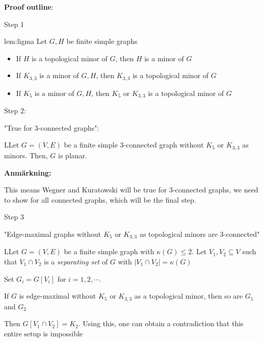 \par\bigskip
\noindent\textbf{Proof outline}:\par
Step 1
\par\bigskip
\begin{lem}{lem:ligma}
  Let $G,H$ be finite simple graphs\par
  \begin{itemize}
    \item If $H$ is a topological minor of $G$, then $H$ is a minor of $G$\par
    \item If $K_{3,3}$ is a minor of $G,H$, then $K_{3,3}$ is a topological minor of $G$\par
    \item If $K_5$ is a minor of $G,H$, then $K_5$ or $K_{3,3}$  is a topological minor of $G$
  \end{itemize}
\end{lem}
\par\bigskip
Step 2:\par
\noindent "True for 3-connected graphs":
\par\bigskip
\begin{lem}
  LLet $G = (V,E)$ be a finite simple 3-connected graph without $K_5$ or $K_{3,3}$ as minors. Then, $G$ is planar.
\end{lem}
\par\bigskip
\noindent\textbf{Anmärkning:}\par
\noindent This means Wegner and Kuratowski will be true for 3-connected graphs, we need to show for all connected graphs, which will be the final step.
\par\bigskip
Step 3\par
\noindent "Edge-maximal graphs without $K_5$ or $K_{3,3}$ as topological minors are 3-connected"
\par\bigskip
\begin{lem}
  LLet $G = (V,E)$ be a finite simple graph with $\kappa(G)\leq 2$. Let $V_1,V_2\subseteq V$ such that $V_1\cap V_2$ is a \textit{separating set} of $G$ with $\left|V_1\cap V_2\right| = \kappa(G)$
  \par\bigskip
  \noindent Set $G_i = G[V_i]$ for $i = 1,2,\cdots$.\par
  \noindent If $G$ is edge-maximal without $K_5$ or $K_{3,3}$ as a topological minor, then so are $G_1$ and $G_2$
  \par\bigskip
  \noindent Then $G[V_1\cap V_2] = K_2$. Using this, one can obtain a contradiction that this entire setup is impossible
\end{lem}
